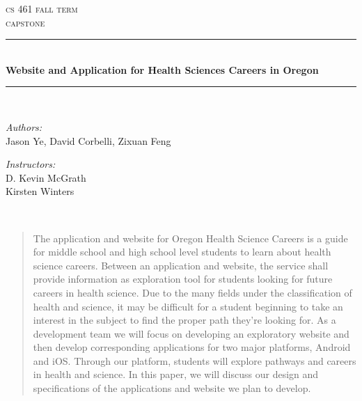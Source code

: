 \documentclass[letterpaper,10pt]{article}
\begin{document}
    \begin{titlepage}
    \newcommand{\HRule}{\rule{\linewidth}{0.5mm}}
    \center 
    \textsc{\Large cs 461 fall term}\\[0.5cm] 
    \textsc{\Large capstone}\\[0.5cm] 
    \HRule \\[0.4cm]
    { \huge \bfseries Website and Application for Health Sciences Careers in Oregon }\\[0.5cm] %
    \HRule \\[1.5cm]
    \begin{minipage}{0.4\textwidth}
        \begin{flushleft} \large
        \emph{Authors:}\\
          Jason Ye, David Corbelli, Zixuan Feng \linebreak
        \end{flushleft}
    \end{minipage}
    \begin{minipage}{0.4\textwidth}
        \begin{flushright} \large
        \emph{Instructors:} \\
        D. Kevin McGrath
		\\
        Kirsten Winters
        \end{flushright}
    \end{minipage}\\[2cm]
    \begin{abstract}
    \item
The application and website for Oregon Health Science Careers is a guide for middle school and high school level students to learn about health science careers. 
Between an application and website, the service shall provide information as exploration tool for students looking for future careers in health science. 
Due to the many fields under the classification of health and science, it may be difficult for a student beginning to take an interest in the subject to find the proper path they’re looking for. 
As a development team we will focus on developing an exploratory website and then develop corresponding applications for two major platforms, Android and iOS.
Through our platform, students will explore pathways and careers in health and science. 
In this paper, we will discuss our design and specifications of the applications and website we plan to develop. 
    \end{abstract}
   

    \end{titlepage}
    
\end{document}
